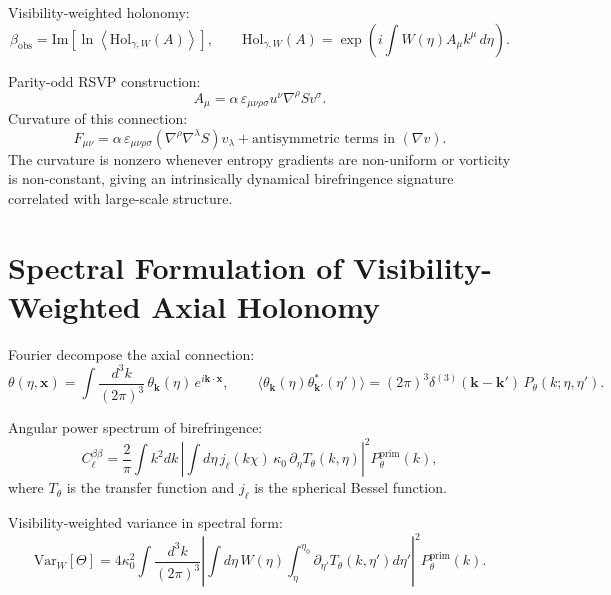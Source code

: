 \documentclass[12pt]{article}
\theoremstyle{definition}
\newcommand{\VarW}{\mathrm{Var}_W}
\begin{document}
Visibility-weighted holonomy:
\begin{equation}
  \beta_{\mathrm{obs}}
  = \mathrm{Im}\!\left[\ln\left\langle\mathrm{Hol}_{\gamma,W}(A)\right\rangle\right],
  \qquad
  \mathrm{Hol}_{\gamma,W}(A)
  = \exp\!\left(i\int W(\eta)A_\mu k^\mu\,d\eta\right).
\end{equation}

Parity-odd RSVP construction:
\begin{equation}
  A_\mu=\alpha\,\varepsilon_{\mu\nu\rho\sigma}u^\nu\nabla^\rho Sv^\sigma.
  \label{eq:Amu_rsvp}
\end{equation}
Curvature of this connection:
\begin{equation}
  F_{\mu\nu}=\alpha\,\varepsilon_{\mu\nu\rho\sigma}
  \left(\nabla^\rho\nabla^\lambda S\right)v_\lambda
  + \text{antisymmetric terms in }(\nabla v).
\end{equation}
The curvature is nonzero whenever entropy gradients are non-uniform
or vorticity is non-constant, giving an intrinsically dynamical
birefringence signature correlated with large-scale structure.

\section{Spectral Formulation of Visibility-Weighted Axial Holonomy}
\label{app:spectral}

Fourier decompose the axial connection:
\begin{equation}
  \theta(\eta,\mathbf{x})
  = \int\frac{d^3k}{(2\pi)^3}\,\theta_{\mathbf{k}}(\eta)\,e^{i\mathbf{k}\cdot\mathbf{x}},
  \qquad
  \langle\theta_{\mathbf{k}}(\eta)\theta_{\mathbf{k}'}^\ast(\eta')\rangle
  = (2\pi)^3\delta^{(3)}(\mathbf{k}-\mathbf{k}')\,P_\theta(k;\eta,\eta').
\end{equation}

Angular power spectrum of birefringence:
\begin{equation}
  C_\ell^{\beta\beta}
  = \frac{2}{\pi}\int k^2dk\,
    \left|\int d\eta\,j_\ell(k\chi)\,\kappa_0\,\partial_\eta T_\theta(k,\eta)\right|^2
    P_\theta^{\mathrm{prim}}(k),
\end{equation}
where $T_\theta$ is the transfer function and $j_\ell$ is the spherical
Bessel function.

Visibility-weighted variance in spectral form:
\begin{equation}
  \VarW[\Theta]
  = 4\kappa_0^2\int\frac{d^3k}{(2\pi)^3}
    \left|\int d\eta\,W(\eta)\int_\eta^{\eta_0}
          \partial_{\eta'}T_\theta(k,\eta')d\eta'\right|^2
    P_\theta^{\mathrm{prim}}(k).
\end{equation}
\end{document}
